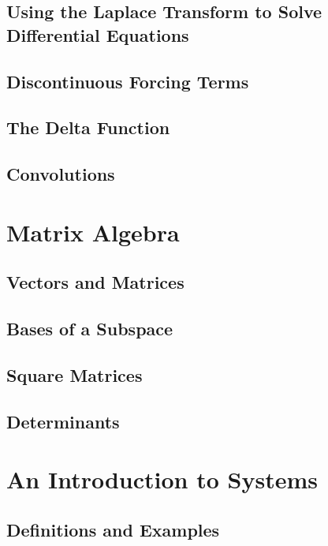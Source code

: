 \documentclass{package/notes}
\begin{document}
\section{Using the Laplace Transform to Solve Differential Equations}

\section{Discontinuous Forcing Terms}

\section{The Delta Function}

\section{Convolutions}




\chapter{Matrix Algebra}

\section{Vectors and Matrices}

\section{Bases of a Subspace}

\section{Square Matrices}

\section{Determinants}




\chapter{An Introduction to Systems}

\section{Definitions and Examples}
\end{document}
